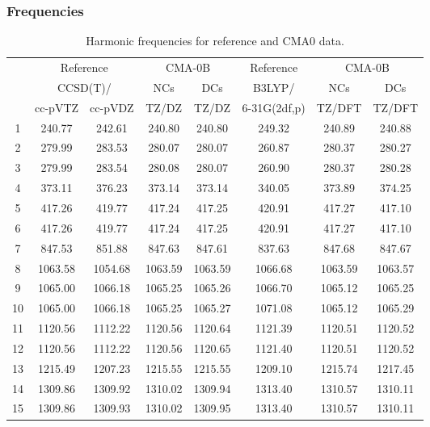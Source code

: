 \documentclass[10pt,oneside]{article}
\begin{document}
\subsubsection*{Frequencies}
\begin{table}[h!]
\centering
\caption{Harmonic frequencies for reference and CMA0 data.}
\begin{tabular}{cccccccc}
\toprule
{} & \multicolumn{2}{c}{Reference} & \multicolumn{2}{c}{CMA-0B} &    Reference & \multicolumn{2}{c}{CMA-0B} \\
{} & \multicolumn{2}{c}{CCSD(T)/} &     NCs &     DCs &       B3LYP/ &     NCs &     DCs \\
{} &   cc-pVTZ & cc-pVDZ &   TZ/DZ &   TZ/DZ & 6-31G(2df,p) &  TZ/DFT &  TZ/DFT \\
\midrule
1  &    240.77 &  242.61 &  240.80 &  240.80 &       249.32 &  240.89 &  240.88 \\
2  &    279.99 &  283.53 &  280.07 &  280.07 &       260.87 &  280.37 &  280.27 \\
3  &    279.99 &  283.54 &  280.08 &  280.07 &       260.90 &  280.37 &  280.28 \\
4  &    373.11 &  376.23 &  373.14 &  373.14 &       340.05 &  373.89 &  374.25 \\
5  &    417.26 &  419.77 &  417.24 &  417.25 &       420.91 &  417.27 &  417.10 \\
6  &    417.26 &  419.77 &  417.24 &  417.25 &       420.91 &  417.27 &  417.10 \\
7  &    847.53 &  851.88 &  847.63 &  847.61 &       837.63 &  847.68 &  847.67 \\
8  &   1063.58 & 1054.68 & 1063.59 & 1063.59 &      1066.68 & 1063.59 & 1063.57 \\
9  &   1065.00 & 1066.18 & 1065.25 & 1065.26 &      1066.70 & 1065.12 & 1065.25 \\
10 &   1065.00 & 1066.18 & 1065.25 & 1065.27 &      1071.08 & 1065.12 & 1065.29 \\
11 &   1120.56 & 1112.22 & 1120.56 & 1120.64 &      1121.39 & 1120.51 & 1120.52 \\
12 &   1120.56 & 1112.22 & 1120.56 & 1120.65 &      1121.40 & 1120.51 & 1120.52 \\
13 &   1215.49 & 1207.23 & 1215.55 & 1215.55 &      1209.10 & 1215.74 & 1217.45 \\
14 &   1309.86 & 1309.92 & 1310.02 & 1309.94 &      1313.40 & 1310.57 & 1310.11 \\
15 &   1309.86 & 1309.93 & 1310.02 & 1309.95 &      1313.40 & 1310.57 & 1310.11 \\

\end{tabular}
\end{table}
\end{document}
